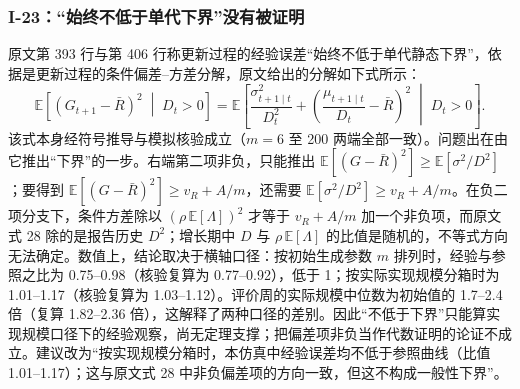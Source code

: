 \subsubsection{I-23：“始终不低于单代下界”没有被证明}

原文第 393 行与第 406 行称更新过程的经验误差“始终不低于单代静态下界”，依据是更新过程的条件偏差–方差分解，原文给出的分解如下式所示：
\begin{equation*}
\mathbb{E}\left[(G_{t+1} - \bar{R})^2 \;\middle|\; D_t > 0\right] = \mathbb{E}\left[\frac{\sigma_{t+1 \mid t}^2}{D_t^2} + \left(\frac{\mu_{t+1 \mid t}}{D_t} - \bar{R}\right)^2 \;\middle|\; D_t > 0\right].
\tag{原文式 28}
\end{equation*}
该式本身经符号推导与模拟核验成立（$m=6$ 至 200 两端全部一致）。问题出在由它推出“下界”的一步。右端第二项非负，只能推出 $\mathbb{E}[(G-\bar R)^2]\ge\mathbb{E}[\sigma^2/D^2]$；要得到 $\mathbb{E}[(G-\bar R)^2]\ge v_R+A/m$，还需要 $\mathbb{E}[\sigma^2/D^2]\ge v_R+A/m$。在负二项分支下，条件方差除以 $(\rho\,\mathbb{E}[\Lambda])^2$ 才等于 $v_R+A/m$ 加一个非负项，而原文式 28 除的是报告历史 $D^2$；增长期中 $D$ 与 $\rho\,\mathbb{E}[\Lambda]$ 的比值是随机的，不等式方向无法确定。数值上，结论取决于横轴口径：按初始生成参数 $m$ 排列时，经验与参照之比为 0.75--0.98（核验复算为 0.77--0.92），低于 1；按实际实现规模分箱时为 1.01--1.17（核验复算为 1.03--1.12）。评价周的实际规模中位数为初始值的 1.7--2.4 倍（复算 1.82--2.36 倍），这解释了两种口径的差别。因此“不低于下界”只能算实现规模口径下的经验观察，尚无定理支撑；把偏差项非负当作代数证明的论证不成立。建议改为“按实现规模分箱时，本仿真中经验误差均不低于参照曲线（比值 1.01--1.17）；这与原文式 28 中非负偏差项的方向一致，但这不构成一般性下界”。
